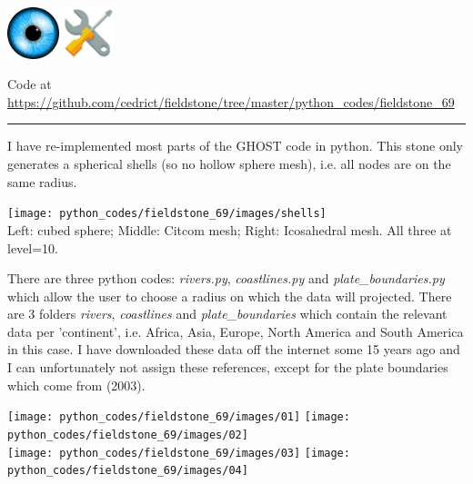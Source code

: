 \includegraphics[height=1.5cm]{images/pictograms/visualisation}
\includegraphics[height=1.5cm]{images/pictograms/tools}



\begin{center}
Code at \url{https://github.com/cedrict/fieldstone/tree/master/python_codes/fieldstone_69}
\end{center}

\par\noindent\rule{\textwidth}{0.4pt}

I have re-implemented most parts of the GHOST code \cite{thie18} in python. 
This stone only generates a spherical shells (so no hollow sphere mesh), 
i.e. all nodes are on the same radius. 

\begin{center}
\texttt{[image: python\_codes/fieldstone\_69/images/shells]}\\
{\captionfont Left: cubed sphere; Middle: Citcom mesh; Right: Icosahedral mesh. 
All three at level=10.}
\end{center}

There are three python codes: {\sl rivers.py}, {\sl coastlines.py} and {\sl plate\_boundaries.py} 
which allow the user to choose a radius on which the data will projected. There are 3 folders 
{\sl rivers}, {\sl coastlines} and {\sl plate\_boundaries} which contain the relevant data per 
'continent', i.e. Africa, Asia, Europe, North America and South America in this case. 
I have downloaded these data off the internet some 15 years ago and I can unfortunately not assign 
these references, except for the plate boundaries which come from \textcite{bird03} (2003).

\begin{center}
\texttt{[image: python\_codes/fieldstone\_69/images/01]}
\texttt{[image: python\_codes/fieldstone\_69/images/02]}\\
\texttt{[image: python\_codes/fieldstone\_69/images/03]}
\texttt{[image: python\_codes/fieldstone\_69/images/04]}
\end{center}

